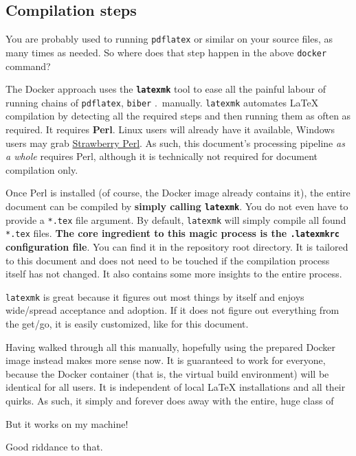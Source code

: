 \subsection{Compilation steps}
\label{ch:compilation_steps}

You are probably used to running \texttt{pdflatex} or similar on your source files,
as many times as needed.
So where does that step happen in the above \texttt{docker} command?

The Docker approach uses the \textbf{\texttt{latexmk}} tool to ease all the painful labour
of running chains of \texttt{pdflatex}, \texttt{biber} .\ manually.
\texttt{latexmk} automates \LaTeX{} compilation by detecting all the required
steps and then running them as often as required.
It requires \textbf{Perl}.
Linux users will already have it available, Windows users may grab
\href{http://strawberryperl.com/}{Strawberry Perl}.
As such, this document's processing pipeline \emph{as a whole} requires Perl,
although it is technically not required for document compilation only.

Once Perl is installed (of course, the Docker image already contains it),
the entire document can be compiled by \textbf{simply calling \texttt{latexmk}}.
You do not even have to provide a \texttt{*.tex} file argument.
By default, \texttt{latexmk} will simply compile all found \texttt{*.tex} files.
\textbf{The core ingredient to this magic process is the \texttt{.latexmkrc} configuration file}.
You can find it in the repository root directory.
It is tailored to this document and does not need to be touched if the compilation
process itself has not changed.
It also contains some more insights to the entire process.

\texttt{latexmk} is great because it figures out most things by itself and enjoys
wide\-/spread acceptance and adoption.
If it does not figure out everything from the get\-/go, it is easily customized,
like for this document.

Having walked through all this manually, hopefully using the prepared Docker image
instead makes more sense now.
It is guaranteed to work for everyone, because the Docker container (that is, the
virtual build environment) will be identical for all users.
It is independent of local \LaTeX{} installations and all their quirks.
As such, it simply and forever does away with the entire, huge class of
\begin{displayquote}
    But it works on my machine!
\end{displayquote}
Good riddance to that.

